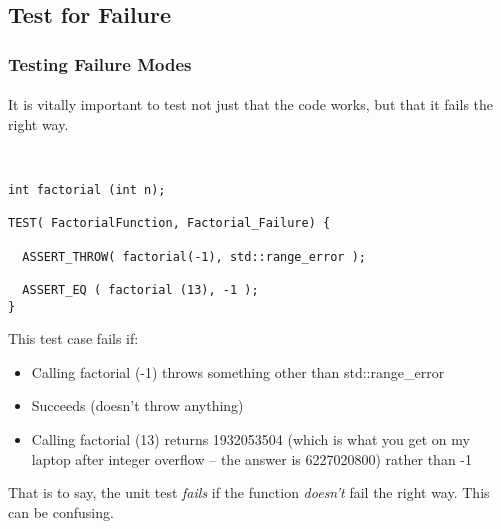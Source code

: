 \subsection{Test for Failure}
\begin{frame}[fragile,t]
\frametitle{Testing Failure Modes}
\framesubtitle{}
It is vitally important to test not just that the code works, but that
it fails the right way.
{\scriptsize\
\begin{verbatim}
int factorial (int n);

TEST( FactorialFunction, Factorial_Failure) {

  ASSERT_THROW( factorial(-1), std::range_error );

  ASSERT_EQ ( factorial (13), -1 );
}
\end{verbatim}}
This test case fails if:
\begin{itemize}
  \item Calling factorial (-1) throws something other than std::range\_error 
  \item Succeeds (doesn't throw anything) 
  \item Calling factorial (13) returns 1932053504 (which is what you get on my laptop after integer overflow -- 
    the answer is 6227020800) rather than -1
\end{itemize}

That is to say, the unit test \emph{fails} if the function \emph{doesn't} fail the right way.  This can be confusing.

\end{frame}


